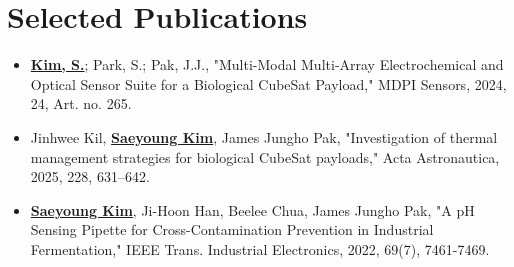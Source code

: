 \documentclass[letterpaper,11pt]{moderncv}
\begin{document}
\section{Selected Publications}
\begin{sloppypar}
\begin{itemize}[leftmargin=1cm, itemsep=0pt, parsep=0pt]
    \item \textbf{\underline{Kim, S.}}; Park, S.; Pak, J.J., "Multi-Modal Multi-Array Electrochemical and Optical Sensor Suite for a Biological CubeSat Payload," MDPI Sensors, 2024, 24, Art. no. 265.
    \item Jinhwee Kil, \textbf{\underline{Saeyoung Kim}}, James Jungho Pak, "Investigation of thermal management strategies for biological CubeSat payloads," Acta Astronautica, 2025, 228, 631--642.
    \item \textbf{\underline{Saeyoung Kim}}, Ji-Hoon Han, Beelee Chua, James Jungho Pak, "A pH Sensing Pipette for Cross-Contamination Prevention in Industrial Fermentation," IEEE Trans. Industrial Electronics, 2022, 69(7), 7461-7469.
\end{itemize}
\end{sloppypar}

\vfill
{}
\end{document}
